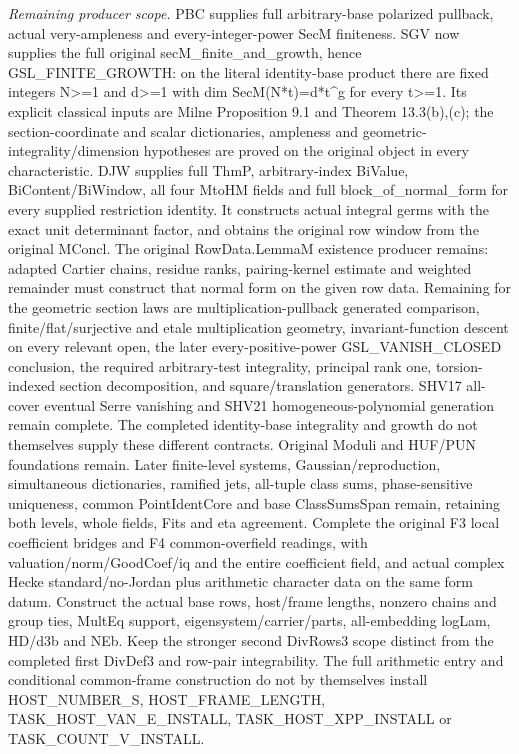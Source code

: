 \documentclass[11pt,a4paper]{article}
\numberwithin{equation}{section}
\theoremstyle{remark}\newtheorem{remark}[theorem]{Remark}
\begin{document}
\emph{Remaining producer scope.} PBC supplies full arbitrary-base polarized pullback, actual very-ampleness and every-integer-power SecM finiteness. SGV now supplies the full original secM\_\allowbreak finite\_\allowbreak and\_\allowbreak growth, hence GSL\_\allowbreak FINITE\_\allowbreak GROWTH: on the literal identity-base product there are fixed integers N>=1 and d>=1 with dim SecM(N*t)=d*t\textasciicircum{}g for every t>=1. Its explicit classical inputs are Milne Proposition 9.1 and Theorem 13.3(b),(c); the section-coordinate and scalar dictionaries, ampleness and geometric-integrality/dimension hypotheses are proved on the original object in every characteristic. DJW supplies full ThmP, arbitrary-index BiValue, BiContent/BiWindow, all four MtoHM fields and full block\_\allowbreak of\_\allowbreak normal\_\allowbreak form for every supplied restriction identity. It constructs actual integral germs with the exact unit determinant factor, and obtains the original row window from the original MConcl. The original RowData.LemmaM existence producer remains: adapted Cartier chains, residue ranks, pairing-kernel estimate and weighted remainder must construct that normal form on the given row data. Remaining for the geometric section laws are multiplication-pullback generated comparison, finite/flat/surjective and etale multiplication geometry, invariant-function descent on every relevant open, the later every-positive-power GSL\_\allowbreak VANISH\_\allowbreak CLOSED conclusion, the required arbitrary-test integrality, principal rank one, torsion-indexed section decomposition, and square/translation generators. SHV17 all-cover eventual Serre vanishing and SHV21 homogeneous-polynomial generation remain complete. The completed identity-base integrality and growth do not themselves supply these different contracts. Original Moduli and HUF/PUN foundations remain. Later finite-level systems, Gaussian/reproduction, simultaneous dictionaries, ramified jets, all-tuple class sums, phase-sensitive uniqueness, common PointIdentCore and base ClassSumsSpan remain, retaining both levels, whole fields, Fits and eta agreement. Complete the original F3 local coefficient bridges and F4 common-overfield readings, with valuation/norm/GoodCoef/iq and the entire coefficient field, and actual complex Hecke standard/no-Jordan plus arithmetic character data on the same form datum. Construct the actual base rows, host/frame lengths, nonzero chains and group ties, MultEq support, eigensystem/carrier/parts, all-embedding logLam, HD/d3b and NEb. Keep the stronger second DivRows3 scope distinct from the completed first DivDef3 and row-pair integrability. The full arithmetic entry and conditional common-frame construction do not by themselves install HOST\_\allowbreak NUMBER\_\allowbreak S, HOST\_\allowbreak FRAME\_\allowbreak LENGTH, TASK\_\allowbreak HOST\_\allowbreak VAN\_\allowbreak E\_\allowbreak INSTALL, TASK\_\allowbreak HOST\_\allowbreak XPP\_\allowbreak INSTALL or TASK\_\allowbreak COUNT\_\allowbreak V\_\allowbreak INSTALL.
\end{document}
